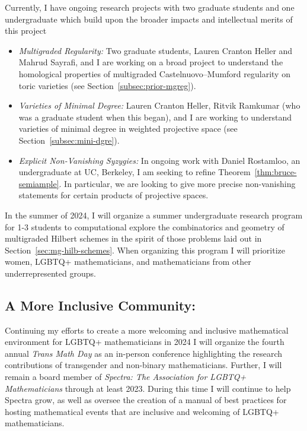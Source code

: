 \documentclass[11pt,reqno]{amsart}
\theoremstyle{remark}
\begin{document}
Currently, I have ongoing research projects with two graduate students and one undergraduate which build upon the broader impacts and intellectual merits of this project
\begin{itemize}
	\item \textit{Multigraded Regularity:} Two graduate students, Lauren Cranton Heller and Mahrud Sayrafi, and I are working on a broad project to understand the homological properties of multigraded Castelnuovo–Mumford regularity on toric varieties (see Section~\ref{subsec:prior-mgreg}). %
	\item \textit{Varieties of Minimal Degree:} Lauren Cranton Heller, Ritvik Ramkumar (who was a graduate student when this began), and I are working to understand varieties of minimal degree in weighted projective space (see Section~\ref{subsec:mini-dgre}).  
	\item \textit{Explicit Non-Vanishing Syzygies:} In ongoing work with Daniel Rostamloo, an undergraduate at UC, Berkeley, I am seeking to refine Theorem~\ref{thm:bruce-semiample}. In particular, we are looking to give more precise non-vanishing statements for certain products of projective spaces. 
\end{itemize}
In the summer of 2024, I will organize a summer undergraduate research program for 1-3 students to computational explore the combinatorics and geometry of multigraded Hilbert schemes in the spirit of those problems laid out in Section~\ref{sec:mg-hilb-schemes}. When organizing this program I will prioritize women, LGBTQ+ mathematicians, and mathematicians from other underrepresented groups. 



\subsection{A More Inclusive Community:} Continuing my efforts to create a more welcoming and inclusive mathematical environment for LGBTQ+ mathematicians in 2024 I will organize the fourth annual \textit{Trans Math Day} as an in-person conference highlighting the research contributions of transgender and non-binary mathematicians. Further, I will remain a board member of \textit{Spectra: The Association for LGBTQ+ Mathematicians} through at least 2023. During this time I will continue to help Spectra grow, as well as oversee the creation of a manual of best practices for hosting mathematical events that are inclusive and welcoming of LGBTQ+ mathematicians.
\end{document}
